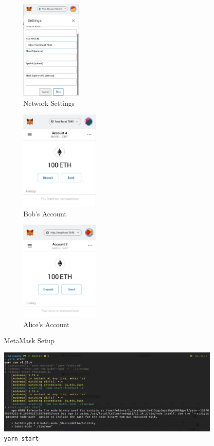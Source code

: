 \documentclass[12pt]{article}
\renewcommand{\_}{\kern-1.5pt\textunderscore\kern-1.5pt}
\begin{document}

\begin{figure}[H]
	\centering
	\begin{subfigure}[b]{.30\textwidth}
		\centering
		\includegraphics[height=5cm]{graphs/09. metamask_setup_network}
		\caption{Network Settings}
	\end{subfigure}
	\begin{subfigure}[b]{.32\textwidth}
		\centering
		\includegraphics[height=5cm]{graphs/11. metamask_setup_bob}
		\caption{Bob's Account}
	\end{subfigure}
	\hspace{1em}
	\begin{subfigure}[b]{.32\textwidth}
		\centering
		\includegraphics[height=5cm]{graphs/13. metamask_setup_alice}
		\caption{Alice's Account}
	\end{subfigure}
	\caption{MetaMask Setup}
\end{figure}

\begin{figure}[H]
	\centering
	\includegraphics[width=13cm]{graphs/14. yarn_start}
	\caption{\texttt{yarn start}}
\end{figure}
\end{document}
